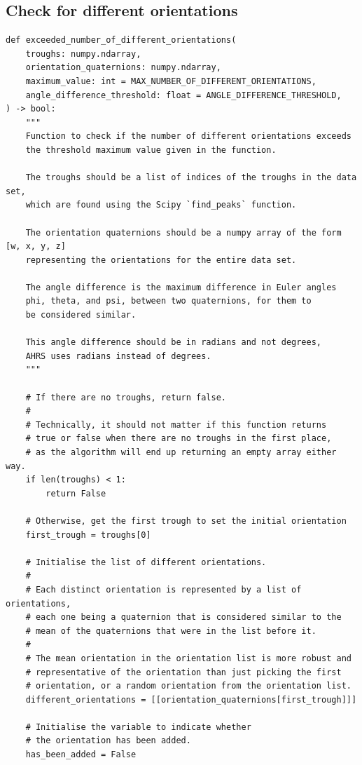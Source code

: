 \documentclass[12pt]{report}
\begin{document}
\subsection{Check for different orientations}
\label{sec:org392ad0d}
\begin{verbatim}
def exceeded_number_of_different_orientations(
    troughs: numpy.ndarray,
    orientation_quaternions: numpy.ndarray,
    maximum_value: int = MAX_NUMBER_OF_DIFFERENT_ORIENTATIONS,
    angle_difference_threshold: float = ANGLE_DIFFERENCE_THRESHOLD,
) -> bool:
    """
    Function to check if the number of different orientations exceeds
    the threshold maximum value given in the function.

    The troughs should be a list of indices of the troughs in the data set,
    which are found using the Scipy `find_peaks` function.

    The orientation quaternions should be a numpy array of the form [w, x, y, z]
    representing the orientations for the entire data set.

    The angle difference is the maximum difference in Euler angles
    phi, theta, and psi, between two quaternions, for them to
    be considered similar.

    This angle difference should be in radians and not degrees,
    AHRS uses radians instead of degrees.
    """

    # If there are no troughs, return false.
    #
    # Technically, it should not matter if this function returns
    # true or false when there are no troughs in the first place,
    # as the algorithm will end up returning an empty array either way.
    if len(troughs) < 1:
        return False

    # Otherwise, get the first trough to set the initial orientation
    first_trough = troughs[0]

    # Initialise the list of different orientations.
    #
    # Each distinct orientation is represented by a list of orientations,
    # each one being a quaternion that is considered similar to the
    # mean of the quaternions that were in the list before it.
    #
    # The mean orientation in the orientation list is more robust and
    # representative of the orientation than just picking the first
    # orientation, or a random orientation from the orientation list.
    different_orientations = [[orientation_quaternions[first_trough]]]

    # Initialise the variable to indicate whether
    # the orientation has been added.
    has_been_added = False


\end{verbatim}
\end{document}

